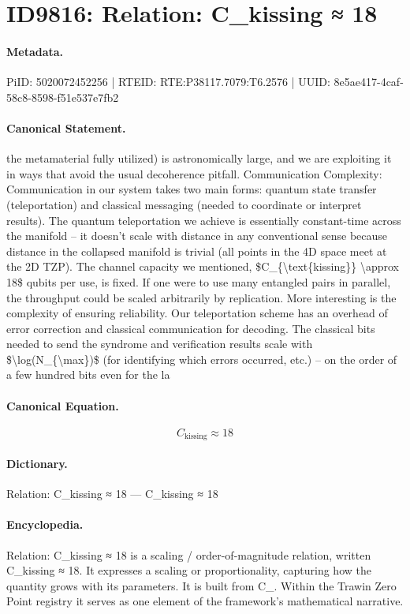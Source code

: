 \section*{ID9816: Relation: C\_kissing ≈ 18}
\paragraph{Metadata.}
PiID: 5020072452256 | RTEID: RTE:P38117.7079:T6.2576 | UUID: 8e5ae417-4caf-58c8-8598-f51e537e7fb2

\paragraph{Canonical Statement.}
the metamaterial fully utilized) is astronomically large, and we are exploiting it in ways that avoid the usual decoherence pitfall. Communication Complexity: Communication in our system takes two main forms: quantum state transfer (teleportation) and classical messaging (needed to coordinate or interpret results). The quantum teleportation we achieve is essentially constant-time across the manifold – it doesn’t scale with distance in any conventional sense because distance in the collapsed manifold is trivial (all points in the 4D space meet at the 2D TZP). The channel capacity we mentioned, \$C\_\{\textbackslash{}text\{kissing\}\} \textbackslash{}approx 18\$ qubits per use, is fixed. If one were to use many entangled pairs in parallel, the throughput could be scaled arbitrarily by replication. More interesting is the complexity of ensuring reliability. Our teleportation scheme has an overhead of error correction and classical communication for decoding. The classical bits needed to send the syndrome and verification results scale with \$\textbackslash{}log(N\_\{\textbackslash{}max\})\$ (for identifying which errors occurred, etc.) – on the order of a few hundred bits even for the la

\paragraph{Canonical Equation.}
\[
C_{\text{kissing}} \approx 18
\]

\paragraph{Dictionary.}
Relation: C\_kissing ≈ 18 — C\_kissing ≈ 18

\paragraph{Encyclopedia.}
Relation: C\_kissing ≈ 18 is a scaling / order-of-magnitude relation, written C\_kissing ≈ 18. It expresses a scaling or proportionality, capturing how the quantity grows with its parameters. It is built from C\_. Within the Trawin Zero Point registry it serves as one element of the framework's mathematical narrative.
